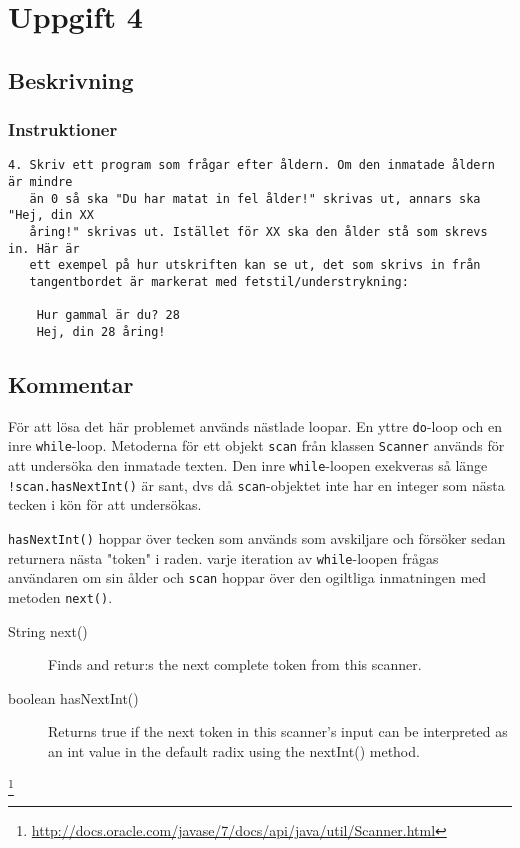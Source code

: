 \section{Uppgift 4}\label{uppgift-4}

\subsection{Beskrivning}
\subsubsection*{Instruktioner}
\begin{verbatim}
4. Skriv ett program som frågar efter åldern. Om den inmatade åldern är mindre
   än 0 så ska "Du har matat in fel ålder!" skrivas ut, annars ska "Hej, din XX
   åring!" skrivas ut. Istället för XX ska den ålder stå som skrevs in. Här är
   ett exempel på hur utskriften kan se ut, det som skrivs in från
   tangentbordet är markerat med fetstil/understrykning:

    Hur gammal är du? 28
    Hej, din 28 åring!
\end{verbatim}

\subsection{Kommentar}
För att lösa det här problemet används nästlade loopar. En yttre
\texttt{do}-loop och en inre \texttt{while}-loop.
Metoderna för ett objekt \texttt{scan} från klassen \texttt{Scanner} används
för att undersöka den inmatade texten. Den inre \texttt{while}-loopen exekveras
så länge \texttt{!scan.hasNextInt()} är sant, dvs då \texttt{scan}-objektet inte
har en integer som nästa tecken i kön för att undersökas.
\par \texttt{hasNextInt()} hoppar över tecken som används som avskiljare och
försöker sedan returnera nästa "token" i raden.
 varje iteration av \texttt{while}-loopen frågas användaren om sin ålder och
\texttt{scan} hoppar över den ogiltliga inmatningen med metoden \texttt{next()}.

\begin{description}
    \item[String next()] Finds and retur:s the next complete token from this scanner.
    \item [boolean hasNextInt()] Returns true if the next token in this scanner's input can be interpreted as an int value in the default radix using the nextInt() method.
        \footnotemark
\end{description}
\footnote{\url{http://docs.oracle.com/javase/7/docs/api/java/util/Scanner.html}}

